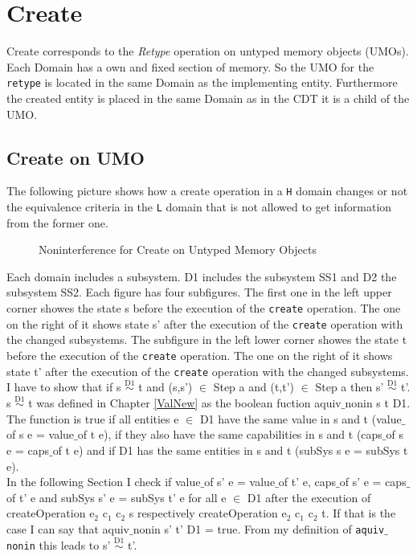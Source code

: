\section{Create}\label{sec:Create}
Create corresponds to the \textit{Retype} operation on untyped memory objects (UMOs). Each Domain has a own and fixed section of memory. So the UMO for the \texttt{retype} is located in the same Domain as the implementing entity. Furthermore the created entity is placed in the same Domain as in the CDT it is a child of the UMO.  
\subsection{Create on UMO}
The following picture shows how a create operation in a \texttt{H} domain changes or not the equivalence criteria in the \texttt{L} domain that is not allowed to get information from the former one. 
\begin{figure}[H]
\caption{Noninterference for Create on Untyped Memory Objects}
\end{figure}
Each domain includes a subsystem. D1 includes the subsystem SS1 and D2 the subsystem SS2. Each figure has four subfigures. The first one in the left upper corner showes the state s before the execution of the \texttt{create} operation. The one on the right of it shows state s' after the execution of the \texttt{create} operation with the changed subsystems. The subfigure in the left lower corner showes the state t before the execution of the \texttt{create} operation. The one on the right of it shows state t' after the execution of the \texttt{create} operation with the changed subsystems.\\
I have to show that if s $\overset{\text{D1}}{\sim}$ t and (s,s') $\in$ Step a and (t,t') $\in$ Step a then s' $\overset{\text{D1}}{\sim}$ t'. 
s $\overset{\text{D1}}{\sim}$ t was defined in Chapter \ref{ValNew} as the boolean fuction aquiv$\_$nonin s t D1. The function is true if all entities e $\in$ D1 have the same value in s and t (value$\_$of s e = value$\_$of t e), if they also have the same capabilities in s and t (caps$\_$of s e = caps$\_$of t e) and if D1 has the same entities in s and t (subSys s e = subSys t e).\\
In the following Section I check if value$\_$of s' e = value$\_$of t' e, caps$\_$of s' e = caps$\_$of t’ e and subSys s' e = subSys t' e for all e $\in$ D1 after the execution of 
createOperation e$_2$ c$_1$ c$_2$ s respectively createOperation e$_2$ c$_1$ c$_2$ t. If that is the case I can say that aquiv$\_$nonin s' t' D1 = true. From my definition of \texttt{aquiv$\_$nonin} this leads to s' $\overset{\text{D1}}{\sim}$ t'. \\ 
